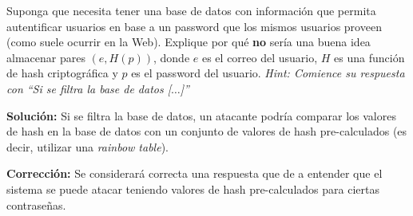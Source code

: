 
Suponga que necesita tener una base de datos con información que permita autentificar usuarios en base a un password que los mismos usuarios proveen (como suele ocurrir en la Web). Explique por qué \textbf{no} sería una buena idea almacenar pares $(e,H(p))$, donde $e$ es el correo del usuario, $H$ es una función de hash criptográfica y $p$ es el password del usuario. \textit{Hint: Comience su respuesta con ``Si se filtra la base de datos [$\ldots$]''}

\textbf{Solución:} Si se filtra la base de datos, un atacante podría comparar los valores de hash en la base de datos con un conjunto de valores de hash pre-calculados (es decir, utilizar una \emph{rainbow table}).

\textbf{Corrección:} Se considerará correcta una respuesta que de a entender que el sistema se puede atacar teniendo valores de hash pre-calculados para ciertas contraseñas.
